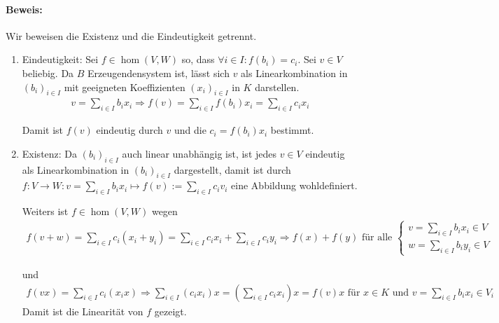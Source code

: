 \paragraph{Beweis:}
	Wir beweisen die Existenz und die Eindeutigkeit getrennt. 
	\begin{enumerate}
		\item Eindeutigkeit: Sei $f\in \hom(V,W)$ so, dass $\forall i\in I: f(b_i)=c_i$. Sei $v\in V$ beliebig. Da $ B $ Erzeugendensystem ist, lässt sich $ v $ als Linearkombination in $(b_i)_{i\in I}$ mit geeigneten Koeffizienten $(x_i)_{i\in I}$ in $ K $ darstellen.
			\begin{gather*}
    				v=\sum_{i\in I}b_ix_i \Rightarrow f(v) = \sum_{i\in I} f(b_i)x_i = \sum_{i\in I}c_ix_i
    			\end{gather*}
    
                        Damit ist $ f(v) $ eindeutig durch $ v $ und die $c_i = f(b_i)x_i$ bestimmt.
    
    		\item Existenz: Da $(b_i)_{i\in I}$ auch linear unabhängig ist, ist jedes $v\in V$ eindeutig als Linearkombination in $(b_i)_{i\in I}$ dargestellt, damit ist durch $f:V\to W: v=\sum_{i\in I}b_ix_i \mapsto f(v):=\sum_{i\in I}c_iv_i$ eine Abbildung wohldefiniert.
    
                        Weiters ist $f\in\hom(V,W)$ wegen
                        \begin{gather*}
                                f(v+w) =\sum_{i\in I}c_i(x_i+y_i)=\sum_{i\in I}c_ix_i+ \sum_{i\in I}c_iy_i\Rightarrow f(x) + f(y) \text{ für alle }\left\{
                                        \begin{array}{l}
                                                v=\sum_{i\in I}b_ix_i \in V\\
                                                w=\sum_{i\in I}b_iy_i \in V
                                        \end{array}
                                \right.
                        \end{gather*}
    
                        und
                        \begin{gather*}
                            f(vx) =\sum_{i\in I}c_i(x_ix)\Rightarrow\sum_{i\in I}(c_ix_i)x = (\sum_{i\in I}c_ix_i)x= f(v)x \text{ für }  x\in K\text{ und }v= \sum_{i\in I}b_ix_i \in V_i
                        \end{gather*}
                        Damit ist die Linearität von $ f $ gezeigt.
        \end{enumerate}
    
